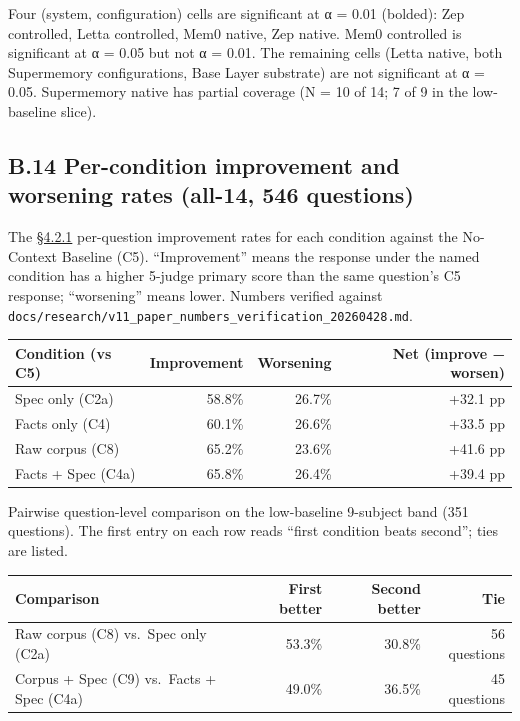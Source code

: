 Four (system, configuration) cells are significant at α = 0.01 (bolded):
Zep controlled, Letta controlled, Mem0 native, Zep native. Mem0
controlled is significant at α = 0.05 but not α = 0.01. The remaining
cells (Letta native, both Supermemory configurations, Base Layer
substrate) are not significant at α = 0.05. Supermemory native has
partial coverage (N = 10 of 14; 7 of 9 in the low-baseline slice).

\hypertarget{b.14-per-condition-improvement-and-worsening-rates-all-14-546-questions}{%
\subsection{B.14 Per-condition improvement and worsening rates (all-14,
546
questions)}\label{b.14-per-condition-improvement-and-worsening-rates-all-14-546-questions}}

The \hyperref[per-question-improvement-rate]{§4.2.1} per-question improvement rates for each condition against the
No-Context Baseline (C5). ``Improvement'' means the response under the
named condition has a higher 5-judge primary score than the same
question's C5 response; ``worsening'' means lower. Numbers verified
against
\texttt{docs/research/v11\_paper\_numbers\_verification\_20260428.md}.

\begin{longtable}[]{@{}lrrr@{}}
\toprule
Condition (vs C5) & Improvement & Worsening & Net (improve − worsen) \\
\midrule
\endhead
Spec only (C2a) & 58.8\% & 26.7\% & +32.1 pp \\
Facts only (C4) & 60.1\% & 26.6\% & +33.5 pp \\
Raw corpus (C8) & 65.2\% & 23.6\% & +41.6 pp \\
Facts + Spec (C4a) & 65.8\% & 26.4\% & +39.4 pp \\
\bottomrule
\end{longtable}

Pairwise question-level comparison on the low-baseline 9-subject band
(351 questions). The first entry on each row reads ``first condition
beats second''; ties are listed.

\begin{longtable}[]{@{}lrrr@{}}
\toprule
Comparison & First better & Second better & Tie \\
\midrule
\endhead
Raw corpus (C8) vs.~Spec only (C2a) & 53.3\% & 30.8\% & 56 questions \\
Corpus + Spec (C9) vs.~Facts + Spec (C4a) & 49.0\% & 36.5\% & 45
questions \\
\bottomrule
\end{longtable}

